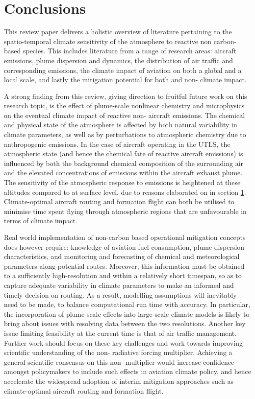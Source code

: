 \section{Conclusions}
This review paper delivers a holistic overview of literature pertaining to the spatio-temporal climate sensitivity of the atmosphere to reactive non carbon-based species. This includes literature from a range of research areas: aircraft emissions, plume dispersion and dynamics, the distribution of air traffic and corresponding emissions, the climate impact of aviation on both a global and a local scale, and lastly the mitigation potential for both  and non- climate impact. 

A strong finding from this review, giving direction to fruitful future work on this research topic, is the effect of plume-scale nonlinear chemistry and microphysics on the eventual climate impact of reactive non- aircraft emissions. The chemical and physical state of the atmosphere is affected by both natural variability in climate parameters, as well as by perturbations to atmospheric chemistry due to anthropogenic emissions. In the case of aircraft operating in the UTLS, the atmospheric state (and hence the chemical fate of reactive aircraft emissions) is influenced by both the background chemical composition of the surrounding air and the elevated concentrations of emissions within the aircraft exhaust plume. The sensitivity of the atmospheric response to emissions is heightened at these altitudes compared to at surface level, due to reasons elaborated on in section \ref{}. Climate-optimal aircraft routing and formation flight can both be utilised to minimise time spent flying through atmospheric regions that are unfavourable in terms of climate impact.

Real world implementation of non-carbon based operational mitigation concepts does however require: knowledge of aviation fuel consumption, plume dispersion characteristics, and monitoring and forecasting of chemical and meteorological parameters along potential routes. Moreover, this information must be obtained to a sufficiently high-resolution and within a relatively short timespan, so as to capture adequate variability in climate parameters to make an informed and timely decision on routing. As a result, modelling assumptions will inevitably need to be made, to balance computational run time with accuracy. In particular, the incorporation of plume-scale effects into large-scale climate models is likely to bring about issues with resolving data between the two resolutions. Another key issue limiting feasibility at the current time is that of air traffic management. Further work should focus on these key challenges and work towards improving scientific understanding of the non- radiative forcing multiplier. Achieving a general scientific consensus on this non- multiplier would increase confidence amongst policymakers to include such effects in aviation climate policy, and hence accelerate the widespread adoption of interim mitigation approaches such as climate-optimal aircraft routing and formation flight.




